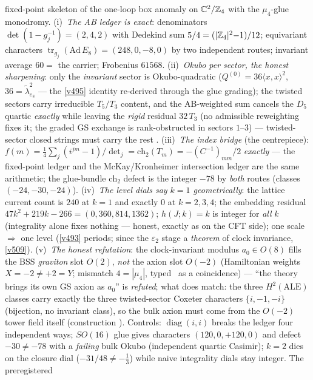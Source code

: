 fixed-point skeleton of the one-loop box anomaly on $\mathbb C^2/\mathbb Z_4$ with the $\mu_4$-glue
monodromy. (i)~\emph{The AB ledger is exact}: denominators $\det(1-g_j^{-1})=(2,4,2)$ with Dedekind
sum $5/4=(|\mathbb Z_4|^2{-}1)/12$; equivariant characters $\operatorname{tr}_{g_j}(\mathrm{Ad}\,E_8)
=(248,0,-8,0)$ by two independent routes; invariant average $60=$ the carrier; Frobenius $61568$.
(ii)~\emph{Okubo per sector, the honest sharpening}: only the \emph{invariant} sector is
Okubo-quadratic ($Q^{(0)}=36\langle x,x\rangle^2$, $36=\tilde\lambda^2_{e_8}$ --- the \vref{v495}
identity re-derived through the glue grading); the twisted sectors carry irreducible $T_5/T_3$
content, and the AB-weighted sum cancels the $D_5$ quartic \emph{exactly} while leaving the
\emph{rigid} residual $32\,T_3$ (no admissible reweighting fixes it; the graded GS exchange is
rank-obstructed in sectors $1$--$3$) --- twisted-sector closed strings must carry the rest \mO.
(iii)~\emph{The index bridge} (the centrepiece): $f(m)=\tfrac14\sum_j(i^{jm}{-}1)/\det_j
=\mathrm{ch}_2(T_m)=-(C^{-1})_{mm}/2$ \emph{exactly} --- the fixed-point ledger and the
McKay/Kronheimer intersection ledger are the same arithmetic; the glue-bundle $\mathrm{ch}_2$
defect is the integer $-78$ by \emph{both} routes (classes $(-24,-30,-24)$). (iv)~\emph{The level
dials say $k=1$ geometrically}: the lattice current count is $240$ at $k{=}1$ and exactly $0$ at
$k=2,3,4$; the embedding residual $47k^2{+}219k{-}266=(0,360,814,1362)$; $h(J;k)=k$ is integer for
\emph{all} $k$ (integrality alone fixes nothing --- honest, exactly as on the CFT side); one scale
$\Rightarrow$ one level (\vref{v493} periods; since the $\varepsilon_2$ stage a \emph{theorem} of
clock invariance, \vref{v509}). (v)~\emph{The honest refutation}: the
clock-invariant modulus $a_0\in O(8)$ fills the BSS \emph{graviton} slot $O(2)$, \emph{not} the
axion slot $O(-2)$ (Hamiltonian weights $X=-2\neq+2=Y$; mismatch $4=|\mu_4|$, typed \mC\ as a
coincidence) --- ``the theory brings its own GS axion as $a_0$'' is \emph{refuted}; what does
match: the three $H^2(\mathrm{ALE})$ classes carry exactly the three twisted-sector Coxeter
characters $\{i,-1,-i\}$ (bijection, no invariant class), so the bulk axion must come from the
$O(-2)$ tower field itself (construction \mO). Controls: $\operatorname{diag}(i,i)$ breaks the
ledger four independent ways; $SO(16)$ glue gives characters $(120,0,+120,0)$ and defect
$-30\neq-78$ with a \emph{failing} bulk Okubo (independent quartic Casimir); $k=2$ dies on the
closure dial ($-31/48\neq-\tfrac13$) while naive integrality dials stay integer. The preregistered
